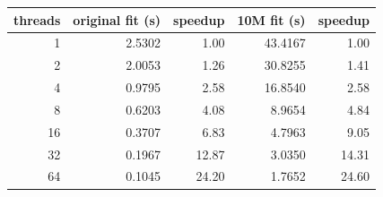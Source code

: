\begin{tabular}{rrrrr}
\toprule
threads & original fit (s) & speedup & 10M fit (s) & speedup\\
\midrule
1 & 2.5302 & 1.00 & 43.4167 & 1.00\\
2 & 2.0053 & 1.26 & 30.8255 & 1.41\\
4 & 0.9795 & 2.58 & 16.8540 & 2.58\\
8 & 0.6203 & 4.08 & 8.9654 & 4.84\\
16 & 0.3707 & 6.83 & 4.7963 & 9.05\\
32 & 0.1967 & 12.87 & 3.0350 & 14.31\\
64 & 0.1045 & 24.20 & 1.7652 & 24.60\\
\bottomrule
\end{tabular}
